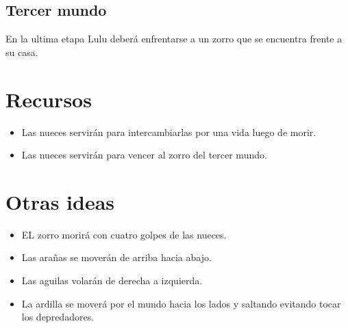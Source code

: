 \documentclass{article}
\begin{document}
\subsection{Tercer mundo}
En la ultima etapa Lulu deberá enfrentarse a un zorro que se encuentra frente a su casa.

\section{Recursos}
\begin{itemize}
    \item Las nueces servirán para intercambiarlas por una vida luego de morir.
    \item Las nueces servirán para vencer al zorro del tercer mundo.
\end{itemize}

\section{Otras ideas}
\begin{itemize}
    \item EL zorro morirá con cuatro golpes de las nueces.
    \item Las arañas se moverán de arriba hacia abajo.
    \item Las aguilas volarán de derecha a izquierda.
    \item La ardilla se moverá por el mundo hacia los lados y saltando evitando tocar los depredadores.
\end{itemize}
\end{document}
